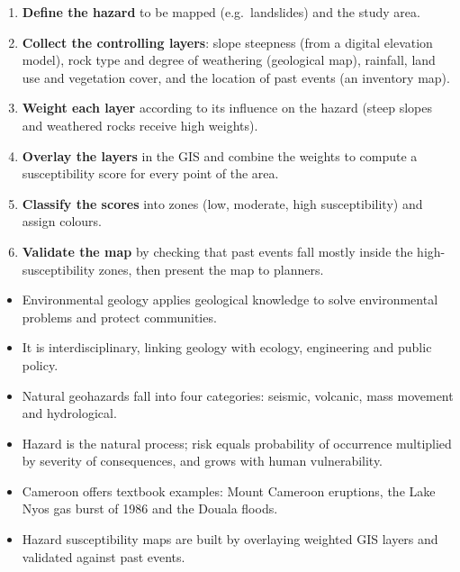\documentclass[11pt]{article}
\begin{document}
\begin{methode}
\begin{enumerate}
\item \textbf{Define the hazard} to be mapped (e.g.\ landslides) and the study area.
\item \textbf{Collect the controlling layers}: slope steepness (from a digital elevation model), rock type and degree of weathering (geological map), rainfall, land use and vegetation cover, and the location of past events (an inventory map).
\item \textbf{Weight each layer} according to its influence on the hazard (steep slopes and weathered rocks receive high weights).
\item \textbf{Overlay the layers} in the GIS and combine the weights to compute a susceptibility score for every point of the area.
\item \textbf{Classify the scores} into zones (low, moderate, high susceptibility) and assign colours.
\item \textbf{Validate the map} by checking that past events fall mostly inside the high-susceptibility zones, then present the map to planners.
\end{enumerate}
\end{methode}

\begin{aretenir}
\begin{itemize}
\item Environmental geology applies geological knowledge to solve environmental problems and protect communities.
\item It is interdisciplinary, linking geology with ecology, engineering and public policy.
\item Natural geohazards fall into four categories: seismic, volcanic, mass movement and hydrological.
\item Hazard is the natural process; risk equals probability of occurrence multiplied by severity of consequences, and grows with human vulnerability.
\item Cameroon offers textbook examples: Mount Cameroon eruptions, the Lake Nyos gas burst of 1986 and the Douala floods.
\item Hazard susceptibility maps are built by overlaying weighted GIS layers and validated against past events.
\end{itemize}
\end{aretenir}
\end{document}
